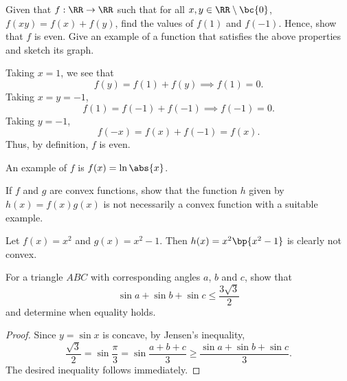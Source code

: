 \begin{problem}
    Given that $f : \RR \to \RR$ such that for all $x, y \in \RR \setminus \bc{0}$, $f(xy) = f(x) + f(y)$, find the values of $f(1)$ and $f(-1)$. Hence, show that $f$ is even. Give an example of a function that satisfies the above properties and sketch its graph.
\end{problem}
\begin{solution}
    Taking $x = 1$, we see that \[f(y) = f(1) + f(y) \implies f(1) = 0.\] Taking $x = y = -1$, \[f(1) = f(-1) + f(-1) \implies f(-1) = 0.\] Taking $y = -1$, \[f(-x) = f(x) + f(-1) = f(x).\] Thus, by definition, $f$ is even.

    An example of $f$ is $f(x) = \ln \abs{x}$.
    \begin{figure}[H]
    \centering
    \end{figure}
\end{solution}

\begin{problem}
    If $f$ and $g$ are convex functions, show that the function $h$ given by $h(x) = f(x) g(x)$ is not necessarily a convex function with a suitable example.
\end{problem}
\begin{solution}
    Let $f(x) = x^2$ and $g(x) = x^2 - 1$. Then $h(x) = x^2\bp{x^2 - 1}$ is clearly not convex.
\end{solution}

\begin{problem}
    For a triangle $ABC$ with corresponding angles $a$, $b$ and $c$, show that \[\sin a + \sin b + \sin c \leq \frac{3\sqrt3}{2}\] and determine when equality holds.
\end{problem}
\begin{proof}
    Since $y = \sin x$ is concave, by Jensen's inequality, \[\frac{\sqrt3}2 = \sin \frac\pi3 = \sin \frac{a + b + c}{3} \geq \frac{\sin a + \sin b + \sin c}{3}.\] The desired inequality follows immediately.
\end{proof}